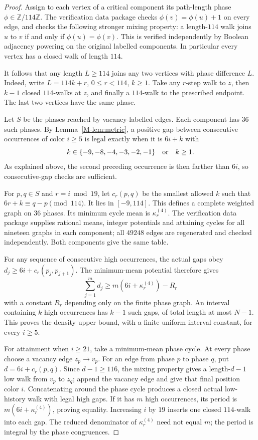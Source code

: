 \documentclass[11pt,reqno]{amsart}
\theoremstyle{plain}
\theoremstyle{plain}
\theoremstyle{plain}
\begin{document}
\begin{proof}
Assign to each vertex of a critical component its path-length phase
$\phi\in\mathbb Z/114\mathbb Z$. The verification data package checks
$\phi(v)=\phi(u)+1$ on every edge, and checks the following stronger
mixing property: a length-$114$ walk joins $u$ to $v$ if and only if
$\phi(u)=\phi(v)$. This is verified independently by Boolean adjacency
powering on the original labelled components. In particular every vertex
has a closed walk of length $114$.

It follows that any length $L\ge114$ joins any two vertices with phase
difference $L$. Indeed, write $L=114k+r$, $0\le r<114$, $k\ge1$.
Take any $r$-step walk to $z$, then $k-1$ closed $114$-walks at $z$,
and finally a $114$-walk to the prescribed endpoint. The last two
vertices have the same phase.

Let $S$ be the phases reached by vacancy-labelled edges. Each component
has $36$ such phases. By Lemma~\ref{M-lem:metric}, a positive gap between
consecutive occurrences of color $i\ge5$ is legal exactly when it is
$6i+k$ with
\[
 k\in\{-9,-8,-4,-3,-2,-1\}\quad\hbox{or}\quad k\ge1.
\]
As explained above, the second preceding occurrence is then farther than
$6i$, so consecutive-gap checks are sufficient.

For $p,q\in S$ and $r=i\bmod19$, let $c_r(p,q)$ be the smallest allowed
$k$ such that $6r+k\equiv q-p\pmod{114}$. It lies in $[-9,114]$.
This defines a complete weighted graph on $36$ phases. Its minimum cycle
mean is $\kappa^{(4)}_r$. The verification data package supplies rational means, integer
potentials and attaining cycles for all nineteen graphs in each component;
all $49248$ edges are regenerated and checked independently. Both
components give the same table.

For any sequence of consecutive high occurrences, the actual gaps obey
$d_j\ge6i+c_r(p_j,p_{j+1})$. The minimum-mean potential therefore gives
\[
 \sum_{j=1}^m d_j\ge m(6i+\kappa^{(4)}_r)-R_r
\]
with a constant $R_r$ depending only on the finite phase graph. An interval
containing $k$ high occurrences has $k-1$ such gaps, of total length at
most $N-1$. This proves the density upper bound, with a finite uniform
interval constant, for every $i\ge5$.

For attainment when $i\ge21$, take a minimum-mean phase cycle. At every
phase choose a vacancy edge $z_p\to v_p$. For an edge from phase $p$ to
phase $q$, put $d=6i+c_r(p,q)$. Since $d-1\ge116$, the mixing property
gives a length-$d-1$ low walk from $v_p$ to $z_q$; append the vacancy
edge and give that final position color $i$. Concatenating around the
phase cycle produces a closed actual low-history walk with legal high
gaps. If it has $m$ high occurrences, its period is
$m(6i+\kappa^{(4)}_r)$, proving equality. Increasing $i$ by $19$ inserts one
closed $114$-walk into each gap. The reduced denominator of $\kappa^{(4)}_r$
need not equal $m$; the period is integral by the phase congruences.


\end{proof}
\end{document}
